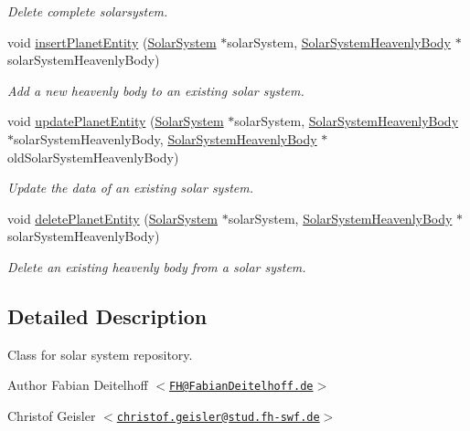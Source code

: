 \begin{DoxyCompactItemize}
\begin{DoxyCompactList}\small\item\em \-Delete complete solarsystem. \end{DoxyCompactList}\item 
void \hyperlink{classSolarSystemRepository_a365ea92e0a2ec7ec683222e89c74356b}{insert\-Planet\-Entity} (\hyperlink{classSolarSystem}{\-Solar\-System} $\ast$solar\-System, \hyperlink{classSolarSystemHeavenlyBody}{\-Solar\-System\-Heavenly\-Body} $\ast$solar\-System\-Heavenly\-Body)
\begin{DoxyCompactList}\small\item\em \-Add a new heavenly body to an existing solar system. \end{DoxyCompactList}\item 
void \hyperlink{classSolarSystemRepository_a0bd7f2f352c52cbc4b1e7f21fbd9518b}{update\-Planet\-Entity} (\hyperlink{classSolarSystem}{\-Solar\-System} $\ast$solar\-System, \hyperlink{classSolarSystemHeavenlyBody}{\-Solar\-System\-Heavenly\-Body} $\ast$solar\-System\-Heavenly\-Body, \hyperlink{classSolarSystemHeavenlyBody}{\-Solar\-System\-Heavenly\-Body} $\ast$old\-Solar\-System\-Heavenly\-Body)
\begin{DoxyCompactList}\small\item\em \-Update the data of an existing solar system. \end{DoxyCompactList}\item 
void \hyperlink{classSolarSystemRepository_a6073be89c1a6d7d895b51bbed8dddb24}{delete\-Planet\-Entity} (\hyperlink{classSolarSystem}{\-Solar\-System} $\ast$solar\-System, \hyperlink{classSolarSystemHeavenlyBody}{\-Solar\-System\-Heavenly\-Body} $\ast$solar\-System\-Heavenly\-Body)
\begin{DoxyCompactList}\small\item\em \-Delete an existing heavenly body from a solar system. \end{DoxyCompactList}\end{DoxyCompactItemize}


\subsection{\-Detailed \-Description}
\-Class for solar system repository.

\begin{DoxyAuthor}{\-Author}
\-Fabian \-Deitelhoff $<$\href{mailto:FH@FabianDeitelhoff.de}{\tt \-F\-H@\-Fabian\-Deitelhoff.\-de}$>$ 

\-Christof \-Geisler $<$\href{mailto:christof.geisler@stud.fh-swf.de}{\tt christof.\-geisler@stud.\-fh-\/swf.\-de}$>$ 
\end{DoxyAuthor}


